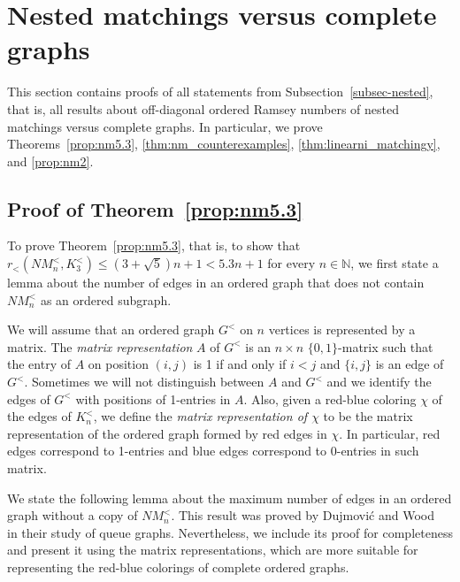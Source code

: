 \documentclass[11pt,a4paper]{article}
\theoremstyle{remark}
\begin{document}
\section{Nested matchings versus complete graphs}

This section contains proofs of all statements from Subsection~\ref{subsec-nested}, that is, all results about off-diagonal ordered Ramsey numbers of nested matchings versus complete graphs.
In particular, we prove Theorems~\ref{prop:nm5.3}, \ref{thm:nm_counterexamples}, \ref{thm:linearni_matchingy}, and \ref{prop:nm2}.



\subsection{Proof of Theorem~\ref{prop:nm5.3}}
\label{subsec-prop:nm5.3}

To prove Theorem~\ref{prop:nm5.3}, that is, to show that $r_<(NM^<_n,K^<_3)\leq \left(3+\sqrt 5\right)n +1< 5.3n+1$ for every $n \in \mathbb{N}$, we first state a lemma about the number of edges in an ordered graph that does not contain $NM^<_n$ as an ordered subgraph.

We will assume that an ordered graph $G^<$ on $n$ vertices is represented by a matrix. 
The \emph{matrix representation} $A$ of $G^<$ is an $n \times n$ $\{0,1\}$-matrix such that the entry of $A$ on position $(i,j)$ is 1 if and only if $i<j$ and $\{i,j\}$ is an edge of $G^<$.
Sometimes we will not distinguish between $A$ and $G^<$ and we identify the edges of $G^<$ with positions of 1-entries in $A$.
Also, given a red-blue coloring $\chi$ of the edges of $K^<_n$, we define the \emph{matrix representation of $\chi$} to be the matrix representation of the ordered graph formed by red edges in $\chi$.
In particular, red edges correspond to 1-entries and blue edges correspond to 0-entries in such matrix.

We state the following lemma about the maximum number of edges in an ordered graph without a copy of $NM^<_n$.
This result was proved by Dujmović and Wood~\cite{dujWoo10} in their study of queue graphs. Nevertheless, we include its proof for completeness and present it using the matrix representations, which are more suitable for representing the red-blue colorings of complete ordered graphs.
\end{document}
